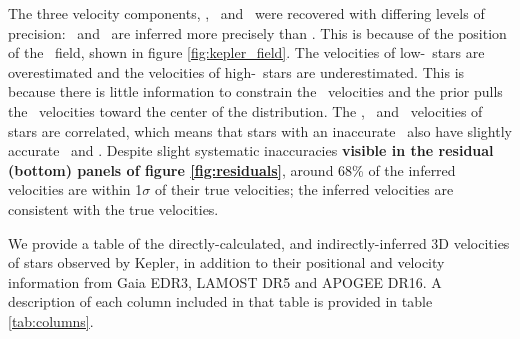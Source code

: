 The three velocity components, \vx, \vy\ and \vz\ were recovered with
differing levels of precision: \vx\ and \vz\ are inferred more precisely than
\vy.
This is because of the position of the \kepler\ field, shown in figure
\ref{fig:kepler_field}.
The velocities of low-\vy\ stars are overestimated and the velocities of
high-\vy\ stars are underestimated.
This is because there is little information to constrain the \vy\ velocities
and the prior pulls the \vy\ velocities toward the center of the distribution.
The \vx, \vy\ and \vz\ velocities of stars are correlated, which means that
stars with an inaccurate \vy\ also have slightly accurate \vz\ and \vx.
Despite slight systematic inaccuracies {\bf visible in the residual (bottom)
panels of figure \ref{fig:residuals}}, around 68\% of the inferred velocities
are within 1$\sigma$ of their true velocities; the inferred velocities are
consistent with the true velocities.

We provide a table of the directly-calculated, and indirectly-inferred 3D
velocities of stars observed by Kepler, in addition to their positional and
velocity information from Gaia EDR3, LAMOST DR5 and APOGEE DR16.
A description of each column included in that table is provided in table
\ref{tab:columns}.


